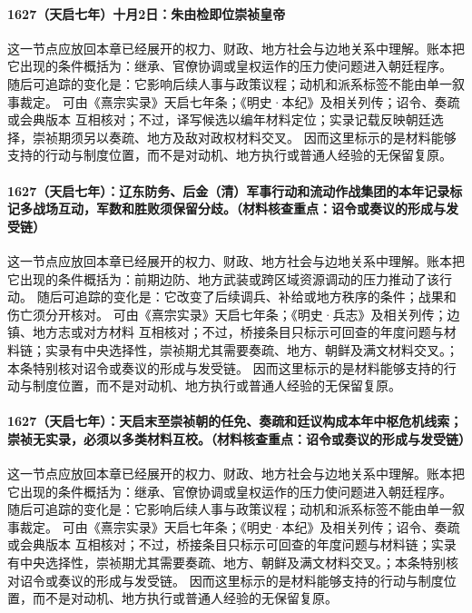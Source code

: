 \paragraph{1627（天启七年）十月2日：朱由检即位崇祯皇帝} 这一节点应放回本章已经展开的权力、财政、地方社会与边地关系中理解。账本把它出现的条件概括为：继承、官僚协调或皇权运作的压力使问题进入朝廷程序。 随后可追踪的变化是：它影响后续人事与政策议程；动机和派系标签不能由单一叙事裁定。 可由《熹宗实录》天启七年条；《明史·本纪》及相关列传；诏令、奏疏或会典版本 互相核对；不过，译写候选以编年材料定位；实录记载反映朝廷选择，崇祯期须另以奏疏、地方及敌对政权材料交叉。 因而这里标示的是材料能够支持的行动与制度位置，而不是对动机、地方执行或普通人经验的无保留复原。

\paragraph{1627（天启七年）：辽东防务、后金（清）军事行动和流动作战集团的本年记录标记多战场互动，军数和胜败须保留分歧。（材料核查重点：诏令或奏议的形成与发受链）} 这一节点应放回本章已经展开的权力、财政、地方社会与边地关系中理解。账本把它出现的条件概括为：前期边防、地方武装或跨区域资源调动的压力推动了该行动。 随后可追踪的变化是：它改变了后续调兵、补给或地方秩序的条件；战果和伤亡须分开核对。 可由《熹宗实录》天启七年条；《明史·兵志》及相关列传；边镇、地方志或对方材料 互相核对；不过，桥接条目只标示可回查的年度问题与材料链；实录有中央选择性，崇祯期尤其需要奏疏、地方、朝鲜及满文材料交叉。；本条特别核对诏令或奏议的形成与发受链。 因而这里标示的是材料能够支持的行动与制度位置，而不是对动机、地方执行或普通人经验的无保留复原。

\paragraph{1627（天启七年）：天启末至崇祯朝的任免、奏疏和廷议构成本年中枢危机线索；崇祯无实录，必须以多类材料互校。（材料核查重点：诏令或奏议的形成与发受链）} 这一节点应放回本章已经展开的权力、财政、地方社会与边地关系中理解。账本把它出现的条件概括为：继承、官僚协调或皇权运作的压力使问题进入朝廷程序。 随后可追踪的变化是：它影响后续人事与政策议程；动机和派系标签不能由单一叙事裁定。 可由《熹宗实录》天启七年条；《明史·本纪》及相关列传；诏令、奏疏或会典版本 互相核对；不过，桥接条目只标示可回查的年度问题与材料链；实录有中央选择性，崇祯期尤其需要奏疏、地方、朝鲜及满文材料交叉。；本条特别核对诏令或奏议的形成与发受链。 因而这里标示的是材料能够支持的行动与制度位置，而不是对动机、地方执行或普通人经验的无保留复原。

